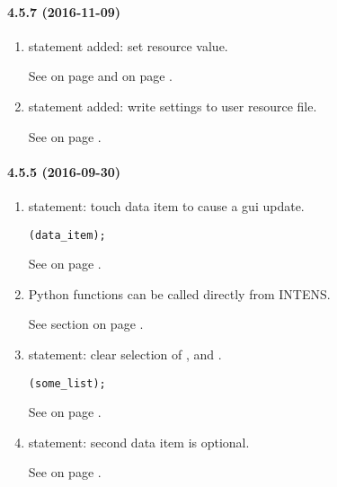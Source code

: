 \paragraph{4.5.7 (2016-11-09)}
\begin{enumerate}

\item \SETRESOURCE{} statement added: set resource value.

  See  on page \pageref{dia:functionexpression}
  and  on page \pageref{dia:datastatement}.

\item \WRITESETTINGS{} statement added: write settings to user resource file.

  See  on page \pageref{dia:filestatement}.

\end{enumerate}
\paragraph{4.5.5 (2016-09-30)}
\begin{enumerate}

\item \TOUCH{} statement: touch data item to cause a gui update. \\
  \begin{boxedminipage}[t]{\linewidth}
    \begin{alltt}
\TOUCH( data_item );
    \end{alltt}
  \end{boxedminipage}

  See  on page \pageref{dia:setstatement}.

\item Python functions can be called directly from INTENS.

  See section  on page \pageref{sec:oppython}.

\item \CLEARSELECTION{} statement: clear selection of \LIST, \TABLE{} and \NAVIGATOR. \\
  \begin{boxedminipage}[t]{\linewidth}
    \begin{alltt}
\CLEARSELECTION( some_list );
    \end{alltt}
  \end{boxedminipage}

  See  on page \pageref{dia:guimorestatement}.

\item \CHANGED{} statement: second data item is optional.

  See  on page \pageref{dia:functionexpression}.

\end{enumerate}
